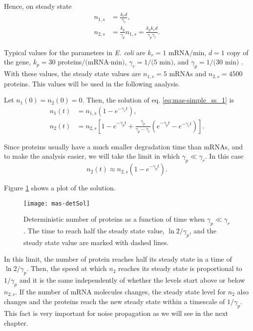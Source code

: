 Hence, on steady state
\begin{equation}
  \label{eq:mas-simple_ss_1}
  \begin{split}
    n_{1,s} &= \frac{k_rd}{\gamma_r},\\
    n_{2,s} &= \frac{k_p}{\gamma_p} n_{1,s} = \frac{k_pk_rd}{\gamma_p\gamma_r}.
  \end{split}
\end{equation}

Typical values for the parameters in \textit{E. coli} are $k_r = 1$ mRNA$/$min, $d=1$ copy of the gene, $k_p = 30$ proteins$/($mRNA$\cdot$min$)$, $\gamma_r = 1/(5$ min$)$, and $\gamma_p = 1/(30$ min$)$ \cite{alon06}. With these values, the steady state values are $n_{1,s}=5$ mRNAs and $n_{2,s}=4500$ proteins. This values will be used in the following analysis.

Let $n_1(0) = n_2(0) = 0$. Then, the solution of eq. \eqref{eq:mas-simple_ss_1} is
\begin{equation*}
\begin{split}
  n_1(t) &= n_{1,s}\left(1-e^{-\gamma_rt}\right),\\
  n_2(t) &= n_{2,s}\left[ 1 - e^{-\gamma_pt} + \frac{\gamma_p}{\gamma_p-\gamma_r}\left(e^{-\gamma_pt}-e^{-\gamma_rt}\right)\right].
\end{split}
\end{equation*}

Since proteins usually have a much smaller degradation time than mRNAs, and to make the analysis easier, we will take the limit in which $\gamma_p \ll \gamma_r$. In this case
\begin{equation*}
n_2(t) \approx n_{2,s}\left(1-e^{-\gamma_pt}\right).
\end{equation*}

Figure \ref{fig:mas-detSol} shows a plot of the solution.
\begin{figure}[H]
  \centering
  \texttt{[image: mas-detSol]}
  \caption[Deterministic equation for the number of proteins in a single gene]{\label{fig:mas-detSol} Deterministic number of proteins as a function of time when $\gamma_p \ll \gamma_r$. The time to reach half the steady state value, $\ln 2/\gamma_p$, and the steady state value are marked with dashed lines.}
\end{figure}

In this limit, the number of protein reaches half its steady state in a time of $\ln 2/\gamma_p$. Then, the speed at which $n_2$ reaches its steady state is proportional to $1/\gamma_p$ and it is the same independently of whether the levels start above or below $n_{2,s}$. If the number of mRNA molecules changes, the steady state level for $n_2$ also changes and the proteins reach the new steady state within a timescale of $1/\gamma_p$. This fact is very important for noise propagation as we will see in the next chapter.

